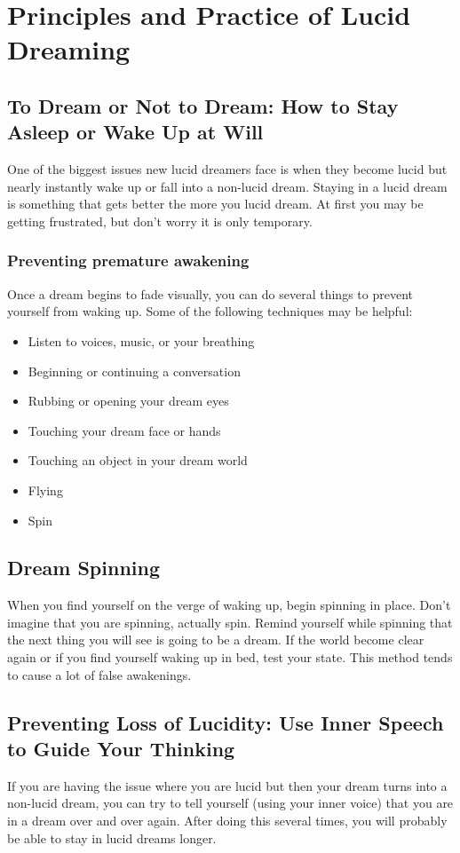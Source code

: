 \documentclass{report}
\begin{document}
\chapter{Principles and Practice of Lucid Dreaming}
\section{To Dream or Not to Dream: How to Stay Asleep or Wake Up at Will}
One of the biggest issues new lucid dreamers face is when they become lucid but nearly instantly wake up or fall into a non-lucid dream. Staying in a lucid dream is something that gets better the more you lucid dream. At first you may be getting frustrated, but don't worry it is only temporary. 

\subsection{Preventing premature awakening}
Once a dream begins to fade visually, you can do several things to prevent yourself from waking up. Some of the following techniques may be helpful:

\begin {itemize}
	\item Listen to voices, music, or your breathing
	\item Beginning or continuing a conversation
	\item Rubbing or opening your dream eyes
	\item Touching your dream face or hands
	\item Touching an object in your dream world
	\item Flying
	\item Spin
\end {itemize}


\section{Dream Spinning}
When you find yourself on the verge of waking up, begin spinning in place. Don't imagine that you are spinning, actually spin. Remind yourself while spinning that the next thing you will see is going to be a dream. If the world become clear again or if you find yourself waking up in bed, test your state. This method tends to cause a lot of false awakenings. 

\section{Preventing Loss of Lucidity: Use Inner Speech to Guide Your Thinking}
If you are having the issue where you are lucid but then your dream turns into a non-lucid dream, you can try to tell yourself (using your inner voice) that you are in a dream over and over again. After doing this several times, you will probably be able to stay in lucid dreams longer. 
\end{document}
